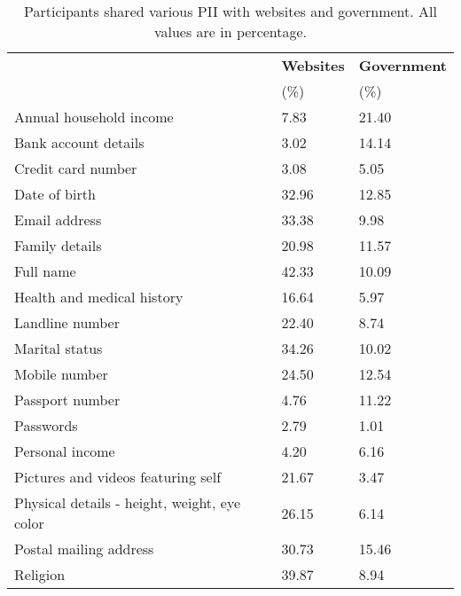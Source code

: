 \begin{table}[!htbp]
\small
\centering
  \caption{\small{Participants shared various PII with websites and government. All values are in percentage.}} \vspace{.2mm}
\begin{tabular}{p{4.0cm} p{1.3cm} p{1.6cm} }
 \hline
\midrule
	\raggedright  & \bf{Websites} &\bf{Government} \\
& (\%) &(\%)\\
\midrule
 \rowcolor {gray!16 }
\raggedright Annual household income &7.83&21.40\\
\raggedright Bank account details &3.02&14.14\\
\rowcolor {gray!16 }
\raggedright Credit card number &3.08&5.05\\
\raggedright Date of birth & 32.96&12.85\\
\rowcolor {gray!16 }
\raggedright Email address &33.38&9.98 \\
\raggedright Family details &20.98&11.57\\
\rowcolor {gray!16 }
\raggedright Full name&42.33&10.09\\
\raggedright Health and medical history &16.64&5.97\\
\rowcolor {gray!16 }
\raggedright Landline number &22.40&8.74\\
\raggedright Marital status&34.26&10.02\\
\rowcolor {gray!16 }
\raggedright Mobile number &24.50&12.54\\
\raggedright Passport number&4.76&11.22\\
\rowcolor {gray!15 }
\raggedright Passwords &2.79&1.01\\
\raggedright Personal income &4.20&6.16\\
\rowcolor {gray!15 }
\raggedright Pictures and videos featuring self &21.67&3.47\\
\raggedright Physical details - height, weight, eye color & 26.15&6.14\\
\rowcolor {gray!15 }
\raggedright Postal mailing address&30.73 &15.46\\
\raggedright Religion &39.87 &8.94\\
\midrule
\hline
\end{tabular}
\vspace{-3mm}
\label{tab:PIIshared}
\end{table}

